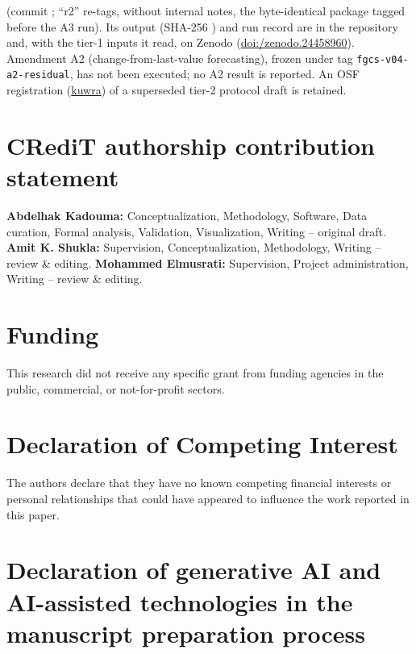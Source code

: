 \documentclass[5p,twocolumn]{elsarticle}
\begin{document}
(commit \texttt{}; ``r2'' re-tags, without
internal notes, the byte-identical package tagged before the A3 run). Its
output (SHA-256
\texttt{})
and run record are in the repository and, with the tier-1 inputs it read,
on Zenodo
(\href{https://doi.org/10.5281/zenodo.24458960}{doi:/\allowbreak zenodo.24458960}).
Amendment A2 (change-from-last-value forecasting), frozen under tag
\texttt{fgcs-v04-a2-residual}, has not been executed; no A2 result is reported.
An OSF registration (\href{https://osf.io/kuwra}{kuwra}) of a superseded
tier-2 protocol draft is retained.

\section*{CRediT authorship contribution statement}

\textbf{Abdelhak Kadouma:} Conceptualization, Methodology, Software, Data curation, Formal analysis, Validation, Visualization, Writing -- original draft. \textbf{Amit K. Shukla:} Supervision, Conceptualization, Methodology, Writing -- review \& editing. \textbf{Mohammed Elmusrati:} Supervision, Project administration, Writing -- review \& editing.


\section*{Funding}

This research did not receive any specific grant from funding agencies in
the public, commercial, or not-for-profit sectors.

\section*{Declaration of Competing Interest}

The authors declare that they have no known competing financial interests or
personal relationships that could have appeared to influence the work reported
in this paper.

\section*{Declaration of generative AI and AI-assisted technologies in the manuscript preparation process}
\end{document}
